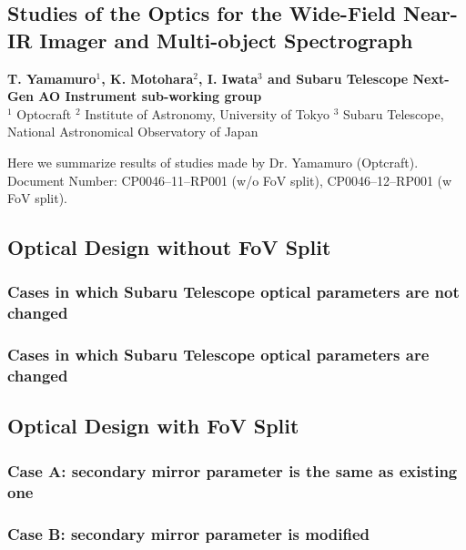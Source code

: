 \def\thisdir{instrument/optics/}

\begin{center}
\section{Studies of the Optics for the Wide-Field Near-IR Imager and
 Multi-object Spectrograph
\label{sec:inst_optics}}
\vspace{0.5cm}

\noindent
\large
{\bf T. Yamamuro$^{1}$, K. Motohara$^{2}$, I. Iwata$^{3}$ and Subaru
Telescope Next-Gen AO Instrument sub-working group}\\
$^1$ Optocraft
$^2$ Institute of Astronomy, University of Tokyo
$^3$ Subaru Telescope, National Astronomical Observatory of Japan
\vspace{0.5cm}

\end{center}

Here we summarize results of studies made by Dr. Yamamuro (Optcraft).
Document Number: CP0046--11--RP001 (w/o FoV split), CP0046--12--RP001 (w
FoV split).

\subsection{Optical Design without FoV Split}

\subsubsection{Cases in which Subaru Telescope optical parameters are
   not changed}

\subsubsection{Cases in which Subaru Telescope optical parameters are
   changed}


\subsection{Optical Design with FoV Split}

\subsubsection{Case A: secondary mirror parameter is the same as
   existing one}

\subsubsection{Case B: secondary mirror parameter is modified}


